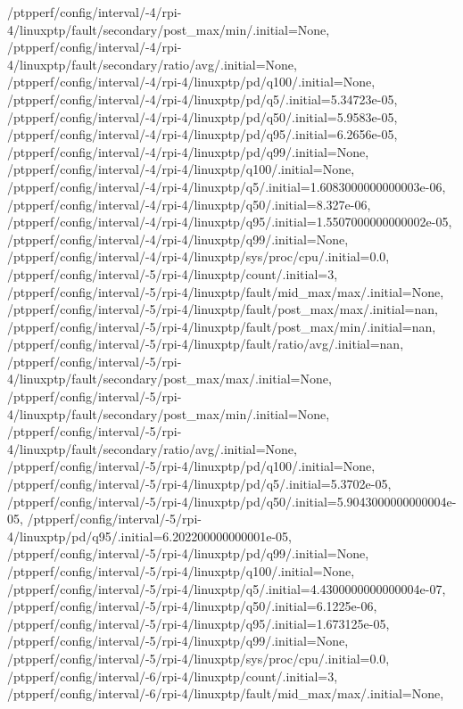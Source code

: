 {    /ptpperf/config/interval/-4/rpi-4/linuxptp/fault/secondary/post_max/min/.initial=None,
    /ptpperf/config/interval/-4/rpi-4/linuxptp/fault/secondary/ratio/avg/.initial=None,
    /ptpperf/config/interval/-4/rpi-4/linuxptp/pd/q100/.initial=None,
    /ptpperf/config/interval/-4/rpi-4/linuxptp/pd/q5/.initial=5.34723e-05,
    /ptpperf/config/interval/-4/rpi-4/linuxptp/pd/q50/.initial=5.9583e-05,
    /ptpperf/config/interval/-4/rpi-4/linuxptp/pd/q95/.initial=6.2656e-05,
    /ptpperf/config/interval/-4/rpi-4/linuxptp/pd/q99/.initial=None,
    /ptpperf/config/interval/-4/rpi-4/linuxptp/q100/.initial=None,
    /ptpperf/config/interval/-4/rpi-4/linuxptp/q5/.initial=1.6083000000000003e-06,
    /ptpperf/config/interval/-4/rpi-4/linuxptp/q50/.initial=8.327e-06,
    /ptpperf/config/interval/-4/rpi-4/linuxptp/q95/.initial=1.5507000000000002e-05,
    /ptpperf/config/interval/-4/rpi-4/linuxptp/q99/.initial=None,
    /ptpperf/config/interval/-4/rpi-4/linuxptp/sys/proc/cpu/.initial=0.0,
    /ptpperf/config/interval/-5/rpi-4/linuxptp/count/.initial=3,
    /ptpperf/config/interval/-5/rpi-4/linuxptp/fault/mid_max/max/.initial=None,
    /ptpperf/config/interval/-5/rpi-4/linuxptp/fault/post_max/max/.initial=nan,
    /ptpperf/config/interval/-5/rpi-4/linuxptp/fault/post_max/min/.initial=nan,
    /ptpperf/config/interval/-5/rpi-4/linuxptp/fault/ratio/avg/.initial=nan,
    /ptpperf/config/interval/-5/rpi-4/linuxptp/fault/secondary/post_max/max/.initial=None,
    /ptpperf/config/interval/-5/rpi-4/linuxptp/fault/secondary/post_max/min/.initial=None,
    /ptpperf/config/interval/-5/rpi-4/linuxptp/fault/secondary/ratio/avg/.initial=None,
    /ptpperf/config/interval/-5/rpi-4/linuxptp/pd/q100/.initial=None,
    /ptpperf/config/interval/-5/rpi-4/linuxptp/pd/q5/.initial=5.3702e-05,
    /ptpperf/config/interval/-5/rpi-4/linuxptp/pd/q50/.initial=5.9043000000000004e-05,
    /ptpperf/config/interval/-5/rpi-4/linuxptp/pd/q95/.initial=6.202200000000001e-05,
    /ptpperf/config/interval/-5/rpi-4/linuxptp/pd/q99/.initial=None,
    /ptpperf/config/interval/-5/rpi-4/linuxptp/q100/.initial=None,
    /ptpperf/config/interval/-5/rpi-4/linuxptp/q5/.initial=4.4300000000000004e-07,
    /ptpperf/config/interval/-5/rpi-4/linuxptp/q50/.initial=6.1225e-06,
    /ptpperf/config/interval/-5/rpi-4/linuxptp/q95/.initial=1.673125e-05,
    /ptpperf/config/interval/-5/rpi-4/linuxptp/q99/.initial=None,
    /ptpperf/config/interval/-5/rpi-4/linuxptp/sys/proc/cpu/.initial=0.0,
    /ptpperf/config/interval/-6/rpi-4/linuxptp/count/.initial=3,
    /ptpperf/config/interval/-6/rpi-4/linuxptp/fault/mid_max/max/.initial=None,
}
